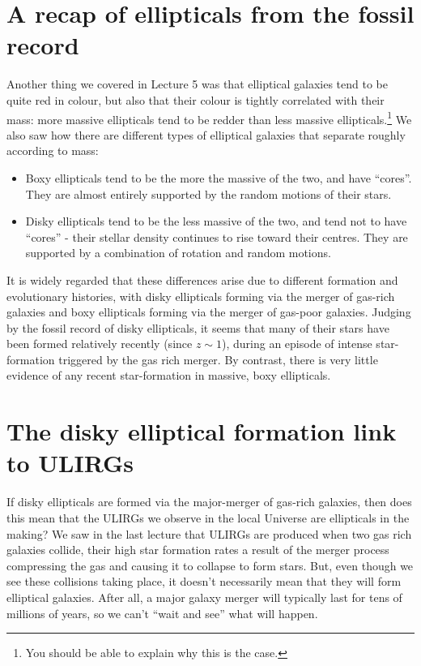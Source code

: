 \documentclass[11pt]{article}
\begin{document}
\section{A recap of ellipticals from the fossil record}
Another thing we covered in Lecture 5 was that elliptical galaxies
tend to be quite red in colour, but also that their colour is tightly
correlated with their mass: more massive ellipticals tend to be redder
than less massive ellipticals.\footnote{You should be able to explain
  why this is the case.} We also saw how there are different types of
elliptical galaxies that separate roughly according to mass:
\begin{itemize}
\item Boxy ellipticals tend to be the more the massive of the two, and
  have ``cores''. They are almost entirely supported by the random
  motions of their stars.
\item Disky ellipticals tend to be the less massive of the two, and
  tend not to have ``cores'' - their stellar density continues to rise
  toward their centres. They are supported by a combination of
  rotation and random motions.
\end{itemize}
It is widely regarded that these differences arise due to different
formation and evolutionary histories, with disky ellipticals forming
via the merger of gas-rich galaxies and boxy ellipticals forming via
the merger of gas-poor galaxies. Judging by the fossil record of disky
ellipticals, it seems that many of their stars have been formed
relatively recently (since $z\sim1$), during an episode of intense
star-formation triggered by the gas rich merger. By contrast, there is
very little evidence of any recent star-formation in massive, boxy
ellipticals.

\section{The disky elliptical formation link to ULIRGs}
If disky ellipticals are formed via the major-merger of gas-rich
galaxies, then does this mean that the ULIRGs we observe in the local
Universe are ellipticals in the making? We saw in the last lecture
that ULIRGs are produced when two gas rich galaxies collide, their
high star formation rates a result of the merger process compressing
the gas and causing it to collapse to form stars. But, even though we
see these collisions taking place, it doesn't necessarily mean that
they will form elliptical galaxies. After all, a major galaxy merger
will typically last for tens of millions of years, so we can't ``wait
and see'' what will happen.
\end{document}

